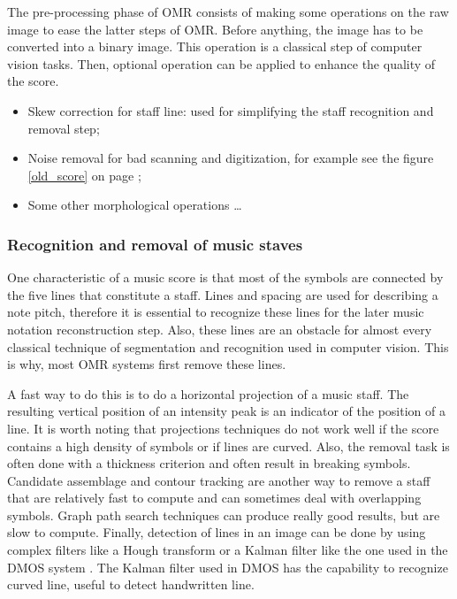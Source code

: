 \documentclass[11pt]{sdm}
\begin{document}
The pre-processing phase of OMR consists of making some operations on the raw image to ease the latter steps of OMR.
Before anything, the image has to be converted into a binary image.
This operation is a classical step of computer vision tasks.
Then, optional operation can be applied to enhance the quality of the score.
\begin{itemize}
  \item Skew correction for staff line: used for simplifying the staff recognition and removal step;
  \item Noise removal for bad scanning and digitization, for example see the figure \ref{old_score} on page \pageref{old_score};
  \item Some other morphological operations \ldots
\end{itemize}

\subsubsection{Recognition and removal of music staves}

One characteristic of a music score is that most of the symbols are connected by the five lines that constitute a staff.
Lines and spacing are used for describing a note pitch, therefore it is essential to recognize these lines for the later music notation reconstruction step.
Also, these lines are an obstacle for almost every classical technique of segmentation and recognition used in computer vision.
This is why, most OMR systems first remove these lines.

A fast way to do this is to do a horizontal projection of a music staff.
The resulting vertical position of an intensity peak is an indicator of the position of a line.
It is worth noting that projections techniques do not work well if the score contains a high density of symbols or if lines are curved.
Also, the removal task is often done with a thickness criterion and often result in breaking symbols.
Candidate assemblage and contour tracking are another way to remove a staff that are relatively fast to compute and can sometimes deal with overlapping symbols.
Graph path search techniques can produce really good results, but are slow to compute.
Finally, detection of lines in an image can be done by using complex filters like a Hough transform or a Kalman filter like the one used in the DMOS system \cite{couasnon_dmos_2001}.
The Kalman filter used in DMOS has the capability to recognize curved line, useful to detect handwritten line.
\end{document}
